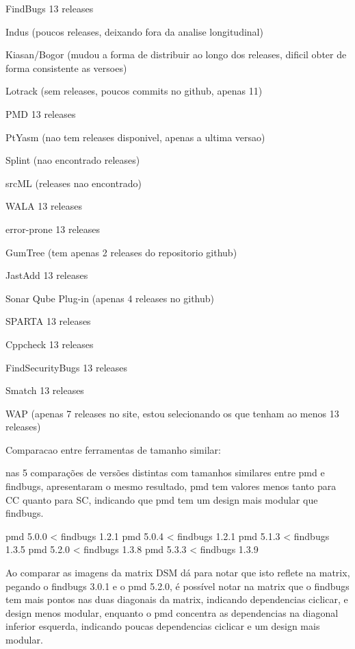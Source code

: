  FindBugs                 13 releases

 Indus                    (poucos releases, deixando fora da analise longitudinal)

 Kiasan/Bogor             (mudou a forma de distribuir ao longo dos releases, dificil obter de forma consistente as versoes)

 Lotrack                  (sem releases, poucos commits no github, apenas 11)

 PMD                      13 releases

 PtYasm                   (nao tem releases disponivel, apenas a ultima versao)

 Splint                   (nao encontrado releases)

 srcML                    (releases nao encontrado)

 WALA                     13 releases

 error-prone              13 releases

 GumTree                  (tem apenas 2 releases do repositorio github)

 JastAdd                  13 releases

 Sonar Qube Plug-in       (apenas 4 releases no github)

 SPARTA                   13 releases

 Cppcheck                 13 releases

 FindSecurityBugs         13 releases
 
 Smatch                   13 releases

 WAP                      (apenas 7 releases no site, estou selecionando os que tenham ao menos 13 releases)

Comparacao entre ferramentas de tamanho similar:

nas 5 comparações de versões distintas com tamanhos similares entre pmd e findbugs,
apresentaram o mesmo resultado, pmd tem valores menos tanto para CC quanto para SC,
indicando que pmd tem um design mais modular que findbugs.

pmd 5.0.0 < findbugs 1.2.1
pmd 5.0.4 < findbugs 1.2.1
pmd 5.1.3 < findbugs 1.3.5
pmd 5.2.0 < findbugs 1.3.8
pmd 5.3.3 < findbugs 1.3.9

Ao comparar as imagens da matrix DSM dá para notar que isto reflete na matrix, 
pegando o findbugs 3.0.1 e o pmd 5.2.0, é possível notar na matrix que o findbugs
tem mais pontos nas duas diagonais da matrix, indicando dependencias ciclicar, e
design menos modular, enquanto o pmd concentra as dependencias na diagonal inferior
esquerda, indicando poucas dependencias ciclicar e um design mais modular.

